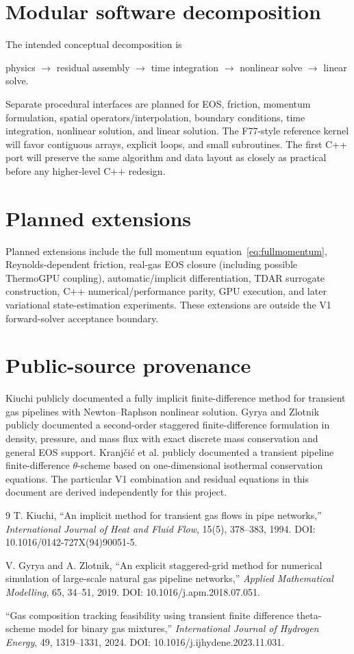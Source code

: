 \documentclass[11pt]{article}
\begin{document}
\section{Modular software decomposition}
The intended conceptual decomposition is
\begin{center}
physics $\rightarrow$ residual assembly $\rightarrow$ time integration $\rightarrow$ nonlinear solve $\rightarrow$ linear solve.
\end{center}
Separate procedural interfaces are planned for EOS, friction, momentum formulation, spatial operators/interpolation, boundary conditions, time integration, nonlinear solution, and linear solution. The F77-style reference kernel will favor contiguous arrays, explicit loops, and small subroutines. The first C++ port will preserve the same algorithm and data layout as closely as practical before any higher-level C++ redesign.

\section{Planned extensions}
Planned extensions include the full momentum equation~\eqref{eq:fullmomentum}, Reynolds-dependent friction, real-gas EOS closure (including possible ThermoGPU coupling), automatic/implicit differentiation, TDAR surrogate construction, C++ numerical/performance parity, GPU execution, and later variational state-estimation experiments. These extensions are outside the V1 forward-solver acceptance boundary.

\section{Public-source provenance}
Kiuchi publicly documented a fully implicit finite-difference method for transient gas pipelines with Newton--Raphson nonlinear solution. Gyrya and Zlotnik publicly documented a second-order staggered finite-difference formulation in density, pressure, and mass flux with exact discrete mass conservation and general EOS support. Kranj\v{c}i\'{c} et al. publicly documented a transient pipeline finite-difference $\theta$-scheme based on one-dimensional isothermal conservation equations. The particular V1 combination and residual equations in this document are derived independently for this project.

\begin{thebibliography}{9}
T. Kiuchi, ``An implicit method for transient gas flows in pipe networks,''
\emph{International Journal of Heat and Fluid Flow}, 15(5), 378--383, 1994.
DOI: 10.1016/0142-727X(94)90051-5.

V. Gyrya and A. Zlotnik, ``An explicit staggered-grid method for numerical simulation of large-scale natural gas pipeline networks,''
\emph{Applied Mathematical Modelling}, 65, 34--51, 2019.
DOI: 10.1016/j.apm.2018.07.051.

``Gas composition tracking feasibility using transient finite difference theta-scheme model for binary gas mixtures,''
\emph{International Journal of Hydrogen Energy}, 49, 1319--1331, 2024.
DOI: 10.1016/j.ijhydene.2023.11.031.
\end{thebibliography}
\end{document}
